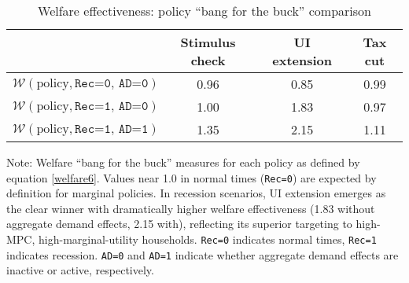 \documentclass{econsocart}
\begin{document}
\begin{table}[tb] 
  \caption{Welfare effectiveness: policy ``bang for the buck'' comparison}
  \label{tab:welfare6}
  \centering

  \begin{tabular*}
    {\textwidth}{@{\extracolsep{\fill}}lccc@{}} %
    \hline
    & Stimulus check & UI extension & Tax cut \\ \hline
    $\mathcal{W}(\text{policy}, \texttt{Rec=0, AD=0})$ & 0.96           & 0.85         & 0.99    \\
    \addlinespace
    $\mathcal{W}(\text{policy}, \texttt{Rec=1, AD=0})$ & 1.00           & 1.83         & 0.97    \\
    $\mathcal{W}(\text{policy}, \texttt{Rec=1, AD=1})$ & 1.35           & 2.15         & 1.11    \\
    \hline
  \end{tabular*}

  \parbox{\textwidth}{
    \medskip
    \footnotesize Note: Welfare ``bang for the buck'' measures for each policy as defined by equation \eqref{welfare6}. Values near 1.0 in normal times (\texttt{Rec=0}) are expected by definition for marginal policies. In recession scenarios, UI extension emerges as the clear winner with dramatically higher welfare effectiveness (1.83 without aggregate demand effects, 2.15 with), reflecting its superior targeting to high-MPC, high-marginal-utility households. \texttt{Rec=0} indicates normal times, \texttt{Rec=1} indicates recession. \texttt{AD=0} and \texttt{AD=1} indicate whether aggregate demand effects are inactive or active, respectively.
  }

\end{table}

\vspace{0.5em}
\end{document}
